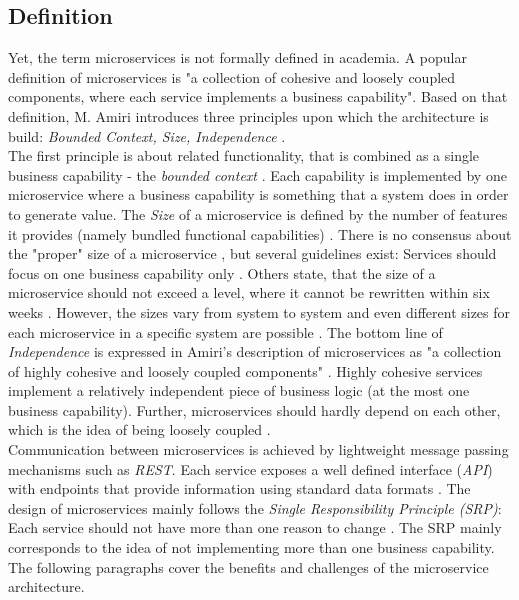 \subsection{Definition}
Yet, the term microservices is not formally defined in academia. A popular definition of microservices is  "a collection of cohesive and loosely coupled components, where each service implements a business capability"\cite{ObjectAwareAmiri}. Based on that definition, M. Amiri introduces three principles upon which the architecture is build: \textit{Bounded Context, Size, Independence} \cite{ObjectAwareAmiri}. \\
The first principle is about related functionality, that is combined as a single business capability - the  \textit{bounded context} \cite{FunctionalDecompositionHeinrich}. Each capability is implemented by one microservice where a business capability is something that a system does in order to generate value\cite{DomainEngineeringMunezero}. The \textit{Size} of a microservice is defined by the number of features it provides (namely bundled functional capabilities)  \cite{WorkloadbasedClustering}. There is no consensus about the "proper" size of a microservice \cite{DomainEngineeringMunezero}, but several guidelines exist: Services should focus on one business capability only \cite{ObjectAwareAmiri}. Others state, that the size of a microservice should not exceed a level, where it cannot be rewritten within six weeks \cite{WorkloadbasedClustering}. However, the sizes vary from system to system \cite{FunctionalDecompositionHeinrich} and even different sizes for each microservice in a specific system are possible \cite{DomainEngineeringMunezero}. The bottom line of \textit{Independence} is expressed in Amiri's description of microservices as "a collection of highly cohesive and loosely coupled components" \cite{ObjectAwareAmiri}. Highly cohesive services implement a relatively independent piece of business logic (at the most one business capability). Further, microservices should hardly depend on each other, which is the idea of being loosely coupled \cite{DataflowDrivenChen}.\\
Communication between microservices is achieved by lightweight message passing mechanisms such as \textit{REST}. Each service exposes a well defined interface (\textit{API}) with endpoints that provide information using standard data formats \cite{FunctionalDecompositionHeinrich}. 
The design of microservices mainly follows the \textit{Single Responsibility Principle (SRP)}: Each service should not have more than one reason to change \cite{TowardsUnderstandingEvolution}. The SRP mainly corresponds to the idea of not implementing more than one business capability.
The following paragraphs cover the benefits and challenges of the microservice architecture.





